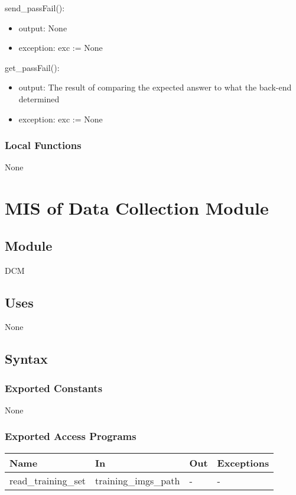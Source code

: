 \documentclass[12pt, titlepage]{article}
\begin{document}
\noindent send\_passFail():
\begin{itemize}
\item output: None
\item exception: exc := None
\end{itemize}

\noindent get\_passFail():
\begin{itemize}
\item output: The result of comparing the expected answer to what the back-end determined
\item exception: exc := None
\end{itemize}
 \subsubsection{Local Functions}
None

\newpage

\section{MIS of Data Collection Module} \label{Module} 
\subsection{Module}
DCM
\subsection{Uses}
None
\subsection{Syntax}
\subsubsection{Exported Constants}
None
\subsubsection{Exported Access Programs}
\begin{center}
\begin{tabular}{p{4cm} p{5cm} p{2cm} p{2cm}}
\hline
\textbf{Name} & \textbf{In} & \textbf{Out} & \textbf{Exceptions} \\
\hline
read\_training\_set & training\_imgs\_path & - & - \\
\hline
\end{tabular}
\end{center}
\end{document}
